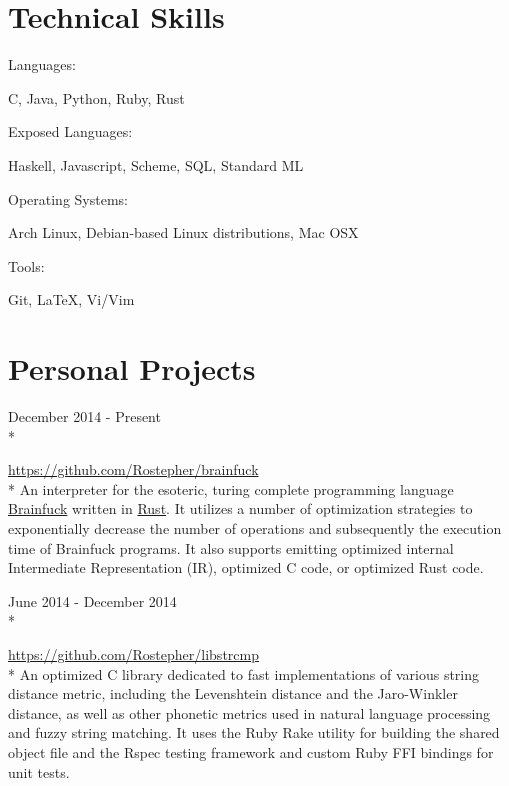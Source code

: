 \documentclass[a4paper,margin,line]{resume}
\newcommand{\rurl}[1]{\hfill {\footnotesize \url{#1}}}
\newcommand{\rdate}[1]{\hfill {\small #1}}
\newcommand{\rproject}[3]{\item[#1] \hfill \rdate{#2} \\* \strut\hfill \rurl{#3} \\*}
\begin{document}
\begin{resume}
\section{\mysidestyle Technical Skills}
	\begin{compactdesc}
		\item[Languages: ] \begin{asparablank} { \small
			\item C, Java, Python, Ruby, Rust
		} \end{asparablank}
        \item[Exposed Languages: ] \begin{asparablank}{ \small
            \item Haskell, Javascript, Scheme, SQL, Standard ML
        } \end{asparablank}
		\item[Operating Systems: ] \begin{asparablank} { \small
            \item Arch Linux, Debian-based Linux distributions, Mac OSX
		} \end{asparablank}
		\item[Tools: ] \begin{asparablank} { \small
            \item Git, \LaTeX, Vi/Vim
		} \end{asparablank}
	\end{compactdesc}

\section{\mysidestyle Personal Projects}
    \begin{asparadesc}
        \rproject{brainfuck}{December 2014 - Present}{https://github.com/Rostepher/brainfuck}
        \small
        An interpreter for the esoteric, turing complete programming language \href{https://en.wikipedia.org/wiki/Brainfuck}{Brainfuck} written in \href{https://rust-lang.org}{Rust}. It utilizes a number of optimization strategies to exponentially decrease the number of operations and subsequently the execution time of Brainfuck programs. It also supports emitting optimized internal Intermediate Representation (IR), optimized C code, or optimized Rust code.
        \normalsize
        \\

        \rproject{libstrcmp}{June 2014 - December 2014}{https://github.com/Rostepher/libstrcmp}
        \small
        An optimized C library dedicated to fast implementations of various string distance metric, including the Levenshtein distance and the Jaro-Winkler distance, as well as other phonetic metrics used in natural language processing and fuzzy string matching. It uses the Ruby Rake utility for building the shared object file and the Rspec testing framework and custom Ruby FFI bindings for unit tests.
        \normalsize
        \\


\end{asparadesc}
\end{resume}
\end{document}
